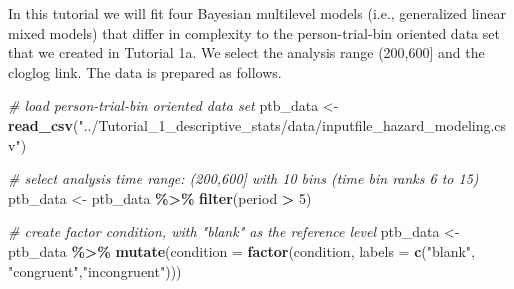 \documentclass[
  man,floatsintext]{apa6}
\newenvironment{Shaded}{\begin{snugshade}}{\end{snugshade}}
\newcommand{\AttributeTok}[1]{\textcolor[rgb]{0.13,0.29,0.53}{#1}}
\newcommand{\CommentTok}[1]{\textcolor[rgb]{0.56,0.35,0.01}{\textit{#1}}}
\newcommand{\DecValTok}[1]{\textcolor[rgb]{0.00,0.00,0.81}{#1}}
\newcommand{\FunctionTok}[1]{\textcolor[rgb]{0.13,0.29,0.53}{\textbf{#1}}}
\newcommand{\NormalTok}[1]{#1}
\newcommand{\OtherTok}[1]{\textcolor[rgb]{0.56,0.35,0.01}{#1}}
\newcommand{\SpecialCharTok}[1]{\textcolor[rgb]{0.81,0.36,0.00}{\textbf{#1}}}
\newcommand{\StringTok}[1]{\textcolor[rgb]{0.31,0.60,0.02}{#1}}
\begin{document}
In this tutorial we will fit four Bayesian multilevel models (i.e., generalized linear mixed models) that differ in complexity to the person-trial-bin oriented data set that we created in Tutorial 1a. We select the analysis range (200,600{]} and the cloglog link. The data is prepared as follows.

\scriptsize

\begin{Shaded}
\begin{Highlighting}[]
\CommentTok{\# load person{-}trial{-}bin oriented data set}
\NormalTok{ptb\_data }\OtherTok{\textless{}{-}} \FunctionTok{read\_csv}\NormalTok{(}\StringTok{"../Tutorial\_1\_descriptive\_stats/data/inputfile\_hazard\_modeling.csv"}\NormalTok{)}

\CommentTok{\# select analysis time range: (200,600] with 10 bins (time bin ranks 6 to 15)}
\NormalTok{ptb\_data }\OtherTok{\textless{}{-}}\NormalTok{ ptb\_data }\SpecialCharTok{\%\textgreater{}\%} \FunctionTok{filter}\NormalTok{(period }\SpecialCharTok{\textgreater{}} \DecValTok{5}\NormalTok{)}

\CommentTok{\# create factor condition, with "blank" as the reference level}
\NormalTok{ptb\_data }\OtherTok{\textless{}{-}}\NormalTok{ ptb\_data }\SpecialCharTok{\%\textgreater{}\%} \FunctionTok{mutate}\NormalTok{(}\AttributeTok{condition =} \FunctionTok{factor}\NormalTok{(condition, }\AttributeTok{labels =} \FunctionTok{c}\NormalTok{(}\StringTok{"blank"}\NormalTok{, }\StringTok{"congruent"}\NormalTok{,}\StringTok{"incongruent"}\NormalTok{)))}


\end{Highlighting}
\end{Shaded}
\end{document}

